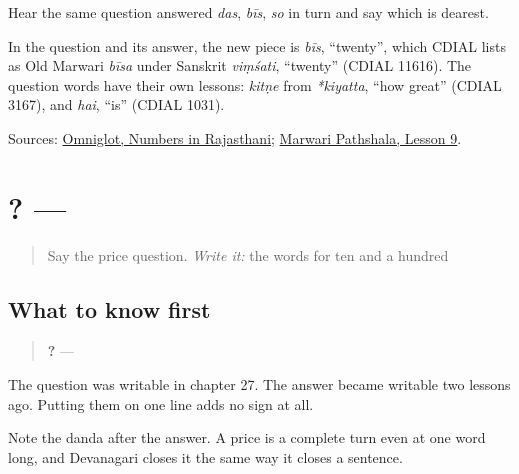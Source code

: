 Hear the same question answered \emph{das}, \emph{bīs}, \emph{so} in turn and say which is dearest.

\begin{cousinweb}
In the question and its answer, the new piece is \emph{bīs}, \textquotedblleft{}twenty\textquotedblright{}, which CDIAL lists as Old Marwari \emph{bīsa} under Sanskrit \emph{viṃśati}, \textquotedblleft{}twenty\textquotedblright{} (CDIAL 11616). The question words have their own lessons: \emph{kitṇe} from \emph{*kiyatta}, \textquotedblleft{}how great\textquotedblright{} (CDIAL 3167), and \emph{hai}, \textquotedblleft{}is\textquotedblright{} (CDIAL 1031).
\end{cousinweb}

\begin{tcolorbox}[breakable,colback=teal!4,colframe=teal!35!black,title={Before you move on}]
Sources: \href{https://www.omniglot.com/language/numbers/rajasthani.htm}{Omniglot, Numbers in Rajasthani}; \href{https://www.marwaripathshala.com/marwari-lesson-9-english}{Marwari Pathshala, Lesson 9}.
\end{tcolorbox}
\section[\texorpdfstring{\mw{ये} \mw{कितणे} \mw{कू} \mw{है}? — \mw{बीस।} (ye kitṇe kū hai? …)}{ये कितणे कू है? — बीस। (ye kitṇe kū hai? …)}]{   ? — }

\label{lesson:MW-C34-price-number}



\begin{quote}
Say the price question. \emph{Write it:} the words for ten and a hundred
\end{quote}

\subsection*{What to know first}
\begin{quote}
\textbf{   ?} — \textbf{}
\end{quote}

The question was writable in chapter 27. The answer became writable two lessons ago. Putting them on one line adds no sign at all.

Note the danda after the answer. A price is a complete turn even at one word long, and Devanagari closes it the same way it closes a sentence.

